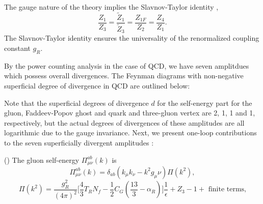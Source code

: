 The gauge nature of the theory implies the Slavnov-Taylor identity \cite{Tay71,Sla73}, 
\begin{equation}
\frac{Z_1}{Z_3}=\frac{\widetilde{Z}_1}{\widetilde{Z}_3}=\frac{Z_{1F}}{Z_2}=\frac{Z_4}{Z_1}.
\end{equation} 
The Slavnov-Taylor identity ensures the universality of the renormalized coupling constant $g_R$.

By the power counting analysis in the case of QCD, we have seven amplitdues which possess overall divergences. The Feynman diagrams with non-negative superficial degree of divergence in QCD are outlined below:

Note that the superficial degrees of divergence $d$ for the self-energy part for the gluon, Faddeev-Popov ghost and quark and three-gluon vertex are 2, 1, 1 and 1, respectively, but the actual degrees of divergences of these amplitudes are all logarithmic due to the gauge invariance. Next, we present one-loop contributions to the seven superficially divergent amplitudes \cite{Muta,Cel79,Pas80}:



() The gluon self-energy $\Pi^{ab}_{\mu\nu}(k)$ is
\begin{equation}
\Pi^{ab}_{\mu\nu}(k)=\delta_{ab}(k_\mu k_\nu-k^2g_\mu\nu)\Pi(k^2),
\end{equation}
\begin{equation}
\Pi(k^2)=\frac{g^2_R}{(4\pi)^2}\biggl[\frac{4}{3}T_RN_f-\frac{1}{2}C_G\left(\frac{13}{3}-\alpha_R \right) \biggr]\frac{1}{\epsilon}+Z_3-1+\text{ finite terms,}
\end{equation}
\def\GLSE1{
	\raisebox{-38.2pt}{
		\begin{axopicture}(100,60)
			\Gluon(5,37)(30,37){3}{3}
			\Gluon(70,37)(95,37){3}{3}
			\GCirc(50,37){20}{0.67}
		\end{axopicture}
		
	}
}	

\def\gGLSE{
	\raisebox{-38.2pt}{
		\begin{axopicture}(100,60)
			\Gluon(5,37)(30,37){3}{3}
			\Gluon(70,37)(95,37){3}{3}
			\GluonArc(50,37)(20,0,360){3}{10}
		\end{axopicture}
		
	}
}	


\def\ggGLSE{
	\raisebox{-38.2pt}{
		\begin{axopicture}(100,60)
			\Gluon(5,37)(50,37){3}{4}
			\Gluon(50,37)(95,37){3}{4}
			\GluonArc(50,60)(20,0,180){3}{5}
			\GluonArc(50,60)(20,180,360){3}{5}
		\end{axopicture}
		
	}
}		


